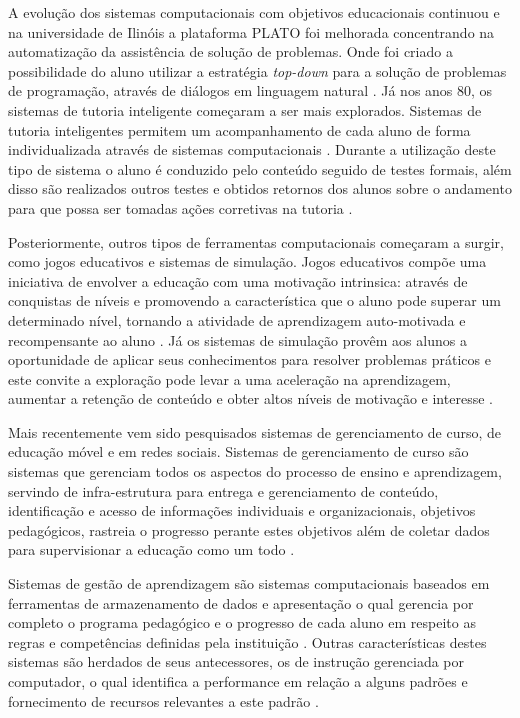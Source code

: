 A evolução dos sistemas computacionais com objetivos educacionais continuou e na universidade de Ilinóis a plataforma PLATO foi melhorada concentrando na automatização da assistência de solução de problemas. Onde foi criado a possibilidade do aluno utilizar a estratégia \emph{top-down} para a solução de problemas de programação, através de diálogos em linguagem natural \cite{danielson75}. Já nos anos 80, os sistemas de tutoria inteligente começaram a ser mais explorados. Sistemas de tutoria inteligentes permitem um acompanhamento de cada aluno de forma individualizada através de sistemas computacionais \cite{bloom84}. Durante a utilização deste tipo de sistema o aluno é conduzido pelo conteúdo seguido de testes formais, além disso são realizados outros testes e obtidos retornos dos alunos sobre o andamento para que possa ser tomadas ações corretivas na tutoria \cite{bloom84}.

Posteriormente, outros tipos de ferramentas computacionais começaram a surgir, como jogos educativos e sistemas de simulação. Jogos educativos compõe uma iniciativa de envolver a educação com uma motivação intrinsica: através de conquistas de níveis e promovendo a característica que o aluno pode superar um determinado nível, tornando a atividade de aprendizagem auto-motivada e recompensante ao aluno \cite{amory99}. Já os sistemas de simulação provêm aos alunos a oportunidade de aplicar seus conhecimentos para resolver problemas práticos e este  convite a exploração pode levar a uma aceleração na aprendizagem, aumentar a retenção de conteúdo e obter altos níveis de motivação e interesse \cite{vandam07}.

Mais recentemente vem sido pesquisados sistemas de gerenciamento de curso, de educação móvel e em redes sociais. Sistemas de gerenciamento de curso são sistemas que gerenciam todos os aspectos do processo de ensino e aprendizagem, servindo de infra-estrutura para entrega e gerenciamento de conteúdo, identificação e acesso de informações individuais e organizacionais, objetivos pedagógicos, rastreia o progresso perante estes objetivos além de coletar dados para supervisionar a educação como um todo \cite{flescher02}.

Sistemas de gestão de aprendizagem são sistemas computacionais baseados em ferramentas de armazenamento de dados e apresentação o qual gerencia por completo o programa pedagógico e o progresso de cada aluno em respeito as regras e competências definidas pela instituição \cite{flescher02}. Outras características destes sistemas são herdados de seus antecessores, os de instrução gerenciada por computador, o qual identifica a performance em relação a alguns padrões e fornecimento de recursos relevantes a este padrão \cite{flescher02}.

